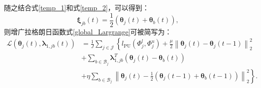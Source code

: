 随之结合式\eqref{temp_1}和式\eqref{temp_2}，可以得到：
\begin{equation}
    \label{temp_3}
    \boldsymbol{\xi}_{jb}\left(t\right) =
    \frac{1}{2}\left({\boldsymbol{\theta}_j}\left(t\right) + \boldsymbol{\theta}_b\left(t\right)\right),
\end{equation}
则增广拉格朗日函数式\eqref{global_Largrange}可被简写为：
\begin{equation}
    \label{Lagrange_optimization_abbreviation}
    \begin{split}
        \mathcal{L}\left({\boldsymbol{\theta}_j}\left(t\right), \boldsymbol\lambda_{1,jb}\left(t\right)\right) &= \frac{1}{J}\sum\limits_{j \in \mathcal{J}} 
        \left\{ l_{\mathrm{PU}}\left(\boldsymbol\varPhi_j^l,\boldsymbol\varPhi_j^u\right) 
        + \frac{\mu}{2}{\left\| {{\boldsymbol{\theta}_j}\left(t\right)} - {{\boldsymbol{\theta}_j}}\left({t - 1} \right) \right\|_2^2} \right.\\
        &+ \sum\limits_{b\in\mathcal{B}_j}\boldsymbol\lambda_{1,jb}^T{\left({\boldsymbol{\theta}_j\left(t\right)} - {\boldsymbol{\theta}_b}\left(t\right)\right) } \\
        &+ \left. \eta\sum\limits_{b \in \mathcal{B}_j}\left\|{\boldsymbol{\theta}_j\left(t\right)}-\frac{1}{2}\left(
        {\boldsymbol{\theta}_j}\left(t-1\right) + {\boldsymbol{\theta}_b}\left(t-1\right)\right)\right\|_2^2 \right\}.
    \end{split}
\end{equation}


